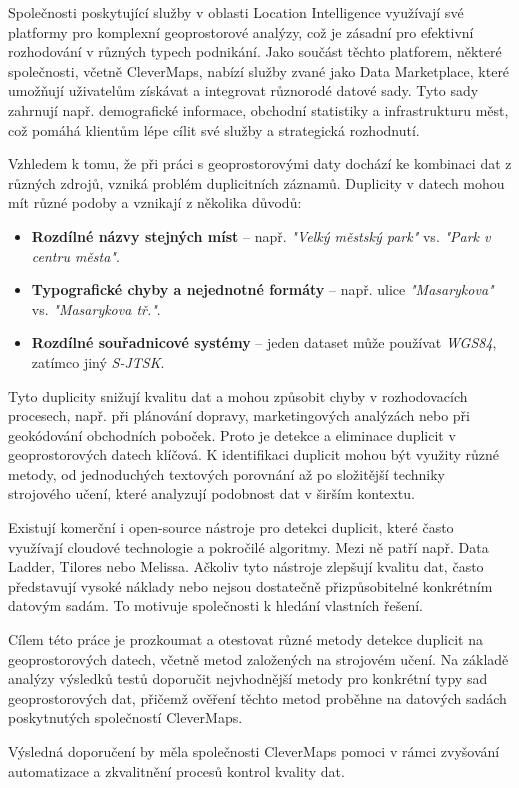 Společnosti poskytující služby v oblasti Location Intelligence využívají své platformy pro komplexní geoprostorové analýzy, což je zásadní pro efektivní rozhodování v různých typech podnikání. Jako součást těchto platforem, některé společnosti, včetně CleverMaps, nabízí služby zvané jako Data Marketplace, které umožňují uživatelům získávat a integrovat různorodé datové sady. Tyto sady zahrnují např. demografické informace, obchodní statistiky a infrastrukturu měst, což pomáhá klientům lépe cílit své služby a strategická rozhodnutí. \cite{clevermaps_location_2024}

Vzhledem k tomu, že při práci s geoprostorovými daty dochází ke kombinaci dat z různých zdrojů, vzniká problém duplicitních záznamů. Duplicity v datech mohou mít různé podoby a vznikají z několika důvodů:

\begin{itemize}
  \item \textbf{Rozdílné názvy stejných míst} – např. \textit{"Velký městský park"} vs. \textit{"Park v centru města"}.
  \item \textbf{Typografické chyby a nejednotné formáty} – např. ulice \textit{"Masarykova"} vs. \textit{"Masarykova tř."}.
  \item \textbf{Rozdílné souřadnicové systémy} – jeden dataset může používat \textit{WGS84}, zatímco jiný \textit{S-JTSK}.
\end{itemize}

Tyto duplicity snižují kvalitu dat a mohou způsobit chyby v rozhodovacích procesech, např. při plánování dopravy, marketingových analýzách nebo při geokódování obchodních poboček. Proto je detekce a eliminace duplicit v geoprostorových datech klíčová. K identifikaci duplicit mohou být využity různé metody, od jednoduchých textových porovnání až po složitější techniky strojového učení, které analyzují podobnost dat v širším kontextu. \cite{nauman_introduction_2022, christen_data_2012}

Existují komerční i open-source nástroje pro detekci duplicit, které často využívají cloudové technologie a pokročilé algoritmy. Mezi ně patří např. Data Ladder, Tilores nebo Melissa. Ačkoliv tyto nástroje zlepšují kvalitu dat, často představují vysoké náklady nebo nejsou dostatečně přizpůsobitelné konkrétním datovým sadám. To motivuje společnosti k hledání vlastních řešení. \cite{christen_data_2012}

Cílem této práce je prozkoumat a otestovat různé metody detekce duplicit na geoprostorových datech, včetně metod založených na strojovém učení. Na základě analýzy výsledků testů doporučit nejvhodnější metody pro konkrétní typy sad geoprostorových dat, přičemž ověření těchto metod proběhne na datových sadách poskytnutých společností CleverMaps.

Výsledná doporučení by měla společnosti CleverMaps pomoci v rámci zvyšování automatizace a zkvalitnění procesů kontrol kvality dat.
